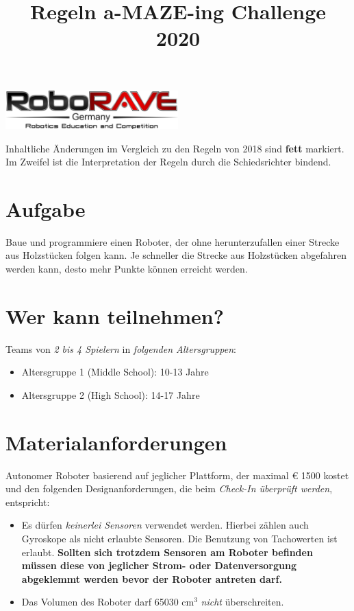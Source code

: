 \documentclass[a4paper,12pt]{article}
\begin{document}
\title{Regeln a-MAZE-ing Challenge 2020}
\makeatletter
\let\inserttitle\@title
\makeatother

 \begin{center}
\includegraphics[width=0.5\textwidth]{logo.png}

\huge                      %
\bfseries                   %
\inserttitle
  \end{center}
  Inhaltliche Änderungen im Vergleich zu den Regeln von 2018 sind \textbf{fett} markiert. Im Zweifel ist die Interpretation der Regeln durch die Schiedsrichter bindend.
\section{Aufgabe}
Baue und programmiere einen Roboter, der ohne herunterzufallen einer Strecke aus Holzstücken folgen
kann. Je schneller die Strecke aus Holzstücken abgefahren werden kann, desto mehr Punkte können erreicht
werden.
\section{Wer kann teilnehmen?}
Teams von \emph{2 bis 4 Spielern} in \emph{folgenden Altersgruppen}:
\begin{itemize}
	\item Altersgruppe 1 (Middle School): 10-13 Jahre
	\item Altersgruppe 2 (High School): 14-17 Jahre
\end{itemize}
\section{Materialanforderungen}
Autonomer Roboter basierend auf jeglicher Plattform, der maximal  \euro{ 1500} kostet und den folgenden
Designanforderungen, die beim \emph{Check-In überprüft werden}, entspricht:
\begin{itemize}
\item Es dürfen \emph{keinerlei Sensoren} verwendet werden. Hierbei zählen auch
Gyroskope als nicht erlaubte Sensoren. Die Benutzung von Tachowerten ist erlaubt.
\textbf{Sollten sich trotzdem Sensoren am Roboter befinden müssen diese von jeglicher Strom- oder
Datenversorgung abgeklemmt werden bevor der Roboter antreten darf.}
\item Das Volumen des Roboter darf 65030 cm$^{3}$ \emph{nicht} überschreiten.
\end{itemize}
\end{document}

